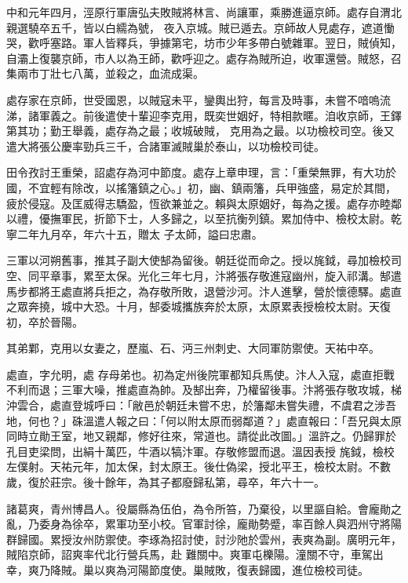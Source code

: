 \begin{pinyinscope}
 中和元年四月，涇原行軍唐弘夫敗賊將林言、尚讓軍，乘勝進逼京師。處存自渭北親選驍卒五千，皆以白繻為號，
 夜入京城。賊已遁去。京師故人見處存，遮道慟哭，歡呼塞路。軍人皆釋兵，爭據第宅，坊市少年多帶白號雜軍。翌日，賊偵知，自灞上復襲京師，市人以為王師，歡呼迎之。處存為賊所迫，收軍還營。賊怒，召集兩市丁壯七八萬，並殺之，血流成渠。



 處存家在京師，世受國恩，以賊寇未平，鑾輿出狩，每言及時事，未嘗不喑嗚流涕，諸軍義之。前後遣使十輩迎李克用，既奕世姻好，特相款暱。洎收京師，王鐸第其功；勤王舉義，處存為之最；收城破賊，
 克用為之最。以功檢校司空。後又遣大將張公慶率勁兵三千，合諸軍滅賊巢於泰山，以功檢校司徒。



 田令孜討王重榮，詔處存為河中節度。處存上章申理，言：「重榮無罪，有大功於國，不宜輕有除改，以搖籓鎮之心。」初，幽、鎮兩籓，兵甲強盛，易定於其間，疲於侵寇。及匡威得志驕盈，恆欲兼並之。賴與太原姻好，每為之援。處存亦睦鄰以禮，優撫軍民，折節下士，人多歸之，以至抗衡列鎮。累加侍中、檢校太尉。乾寧二年九月卒，年六十五，贈太
 子太師，謚曰忠肅。



 三軍以河朔舊事，推其子副大使郜為留後。朝廷從而命之。授以旄鉞，尋加檢校司空、同平章事，累至太保。光化三年七月，汴將張存敬進寇幽州，旋入祁溝。郜遣馬步都將王處直將兵拒之，為存敬所敗，退營沙河。汴人進擊，營於懷德驛。處直之眾奔撓，城中大恐。十月，郜委城攜族奔於太原，太原累表授檢校太尉。天復初，卒於晉陽。



 其弟鄴，克用以女妻之，歷嵐、石、沔三州刺史、大同軍防禦使。天祐中卒。



 處直，字允明，處
 存母弟也。初為定州後院軍都知兵馬使。汴人入寇，處直拒戰不利而退；三軍大噪，推處直為帥。及郜出奔，乃權留後事。汴將張存敬攻城，梯沖雲合，處直登城呼曰：「敝邑於朝廷未嘗不忠，於籓鄰未嘗失禮，不虞君之涉吾地，何也？」硃溫遣人報之曰：「何以附太原而弱鄰道？」處直報曰：「吾兄與太原同時立勛王室，地又親鄰，修好往來，常道也。請從此改圖。」溫許之。仍歸罪於孔目吏梁問，出絹十萬匹，牛酒以犒汴軍。存敬修盟而退。溫因表授
 旄鉞，檢校左僕射。天祐元年，加太保，封太原王。後仕偽梁，授北平王，檢校太尉。不數歲，復於莊宗。後十餘年，為其子都廢歸私第，尋卒，年六十一。



 諸葛爽，青州博昌人。役屬縣為伍伯，為令所笞，乃棄役，以里謳自給。會龐勛之亂，乃委身為徐卒，累軍功至小校。官軍討徐，龐勛勢蹙，率百餘人與泗州守將陽群歸國。累授汝州防禦使。李琢為招討使，討沙阤於雲州，表爽為副。廣明元年，賊陷京師，詔爽率代北行營兵馬，赴
 難關中。爽軍屯櫟陽。潼關不守，車駕出幸，爽乃降賊。巢以爽為河陽節度使。巢賊敗，復表歸國，進位檢校司徒。




\end{pinyinscope}
